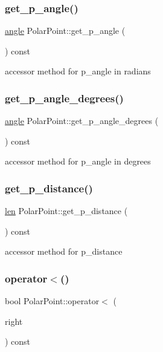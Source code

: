 \subsubsection{\texorpdfstring{get\_p\_angle()}{get\_p\_angle()}}
{\footnotesize\ttfamily \mbox{\hyperlink{primitives_8h_a41ee332ff1a31807cb838b616c186dd7}{angle}} Polar\+Point\+::get\+\_\+p\+\_\+angle (\begin{DoxyParamCaption}{ }\end{DoxyParamCaption}) const}

accessor method for p\+\_\+angle in radians \mbox{\label{class_polar_point_a32537087535c21aee75a7799c168645d}} 
\subsubsection{\texorpdfstring{get\_p\_angle\_degrees()}{get\_p\_angle\_degrees()}}
{\footnotesize\ttfamily \mbox{\hyperlink{primitives_8h_a41ee332ff1a31807cb838b616c186dd7}{angle}} Polar\+Point\+::get\+\_\+p\+\_\+angle\+\_\+degrees (\begin{DoxyParamCaption}{ }\end{DoxyParamCaption}) const}

accessor method for p\+\_\+angle in degrees \mbox{\label{class_polar_point_afb68d253c45fe88bc49fafcf81ec2276}} 
\subsubsection{\texorpdfstring{get\_p\_distance()}{get\_p\_distance()}}
{\footnotesize\ttfamily \mbox{\hyperlink{primitives_8h_a0daa439ba651ea0fd8d02392244db601}{len}} Polar\+Point\+::get\+\_\+p\+\_\+distance (\begin{DoxyParamCaption}{ }\end{DoxyParamCaption}) const}

accessor method for p\+\_\+distance \mbox{\label{class_polar_point_a705e9afe8f23c0cac34b25a006c574e8}} 
\subsubsection{\texorpdfstring{operator$<$()}{operator<()}}
{\footnotesize\ttfamily bool Polar\+Point\+::operator$<$ (\begin{DoxyParamCaption}\item[{const \mbox{\hyperlink{class_polar_point}{Polar\+Point}} \&}]{right }\end{DoxyParamCaption}) const}

